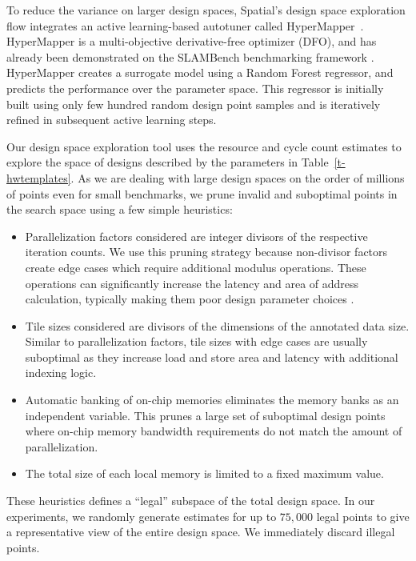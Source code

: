 To reduce the variance on larger design spaces, Spatial's design space exploration flow integrates an active learning-based autotuner called HyperMapper~\cite{Bodin2016:PACT16,NardiBSVDK17,Saeedi_ICRA_2017}.
HyperMapper is a multi-objective derivative-free optimizer (DFO), and has already been demonstrated on the SLAMBench benchmarking framework \cite{nardi2015introducing}.
HyperMapper creates a surrogate model using a Random Forest regressor, and predicts the performance over the parameter space. This regressor is initially built using only few hundred random design point samples and is iteratively refined in subsequent active learning steps.

Our design space exploration tool uses the resource and cycle count estimates
to explore the space of designs described by the parameters in Table~\ref{t-hwtemplates}.
As we are dealing with large design spaces on the order of millions of points even for small benchmarks,
we prune invalid and suboptimal points in the search space using a few simple heuristics:
\begin{itemize}
  \item Parallelization factors considered are integer divisors of the respective iteration counts. We use this pruning strategy because non-divisor factors create edge cases which require additional modulus operations. These operations can significantly increase the latency and area of address calculation, typically making them poor design parameter choices \cite{raghus-paper}.
  \item Tile sizes considered are divisors of the dimensions of the annotated data size. Similar to parallelization factors, tile sizes with edge cases are usually suboptimal as they increase load and store area and latency with additional indexing logic.
  \item Automatic banking of on-chip memories eliminates the memory banks as an independent variable. This prunes a large set of suboptimal design points where on-chip memory bandwidth requirements do not match the amount of parallelization.
  \item The total size of each local memory is limited to a fixed maximum value.
\end{itemize}

These heuristics defines a ``legal'' subspace of the total design space.
In our experiments, we randomly generate estimates for up to $75,000$ legal
points to give a representative view of the entire design space. We immediately
discard illegal points.
